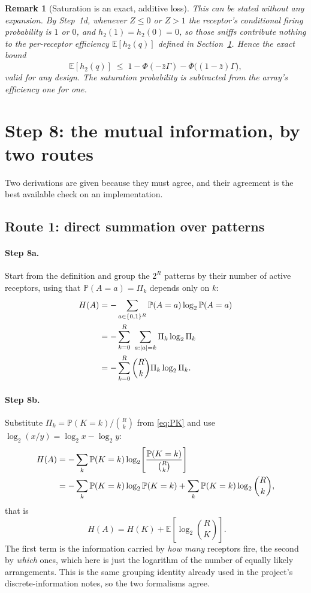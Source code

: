 \documentclass[11pt,a4paper]{article}
\newtheorem{remark}{Remark}
\newcommand{\EE}{\mathbb{E}}
\newcommand{\PP}{\mathbb{P}}
\newcommand{\Phibar}{\overline{\Phi}}
\newcommand{\htwo}{h_2}
\begin{document}
\begin{remark}[Saturation is an exact, additive loss]
This can be stated without any expansion. By Step~1d, whenever $Z\le0$ or $Z>1$ the
receptor's conditional firing probability is $1$ or $0$, and $\htwo(1)=\htwo(0)=0$, so
those sniffs contribute nothing to the per-receptor efficiency $\EE[\htwo(q)]$ defined in
Section~\ref{sec:step6}. Hence the exact bound
\begin{equation}
  \EE[\htwo(q)] \;\le\; 1 - \Phi(-\bar z\Gamma) - \Phibar\big((1-\bar z)\Gamma\big),
\end{equation}
valid for any design. The saturation probability is subtracted from the array's
efficiency one for one.
\end{remark}

\section{Step 8: the mutual information, by two routes}
\label{sec:step6}

Two derivations are given because they must agree, and their agreement is the best
available check on an implementation.

\subsection{Route 1: direct summation over patterns}

\paragraph{Step 8a.} Start from the definition and group the $2^R$ patterns by their
number of active receptors, using that $\PP(A=a)=\Pi_k$ depends only on $k$:
\begin{align}
  H(A) &= -\sum_{a\in\{0,1\}^R}\PP(A=a)\log_2\PP(A=a) \notag\\
       &= -\sum_{k=0}^{R}\ \sum_{a:|a|=k}\Pi_k\log_2\Pi_k \notag\\
       &= -\sum_{k=0}^{R}\binom{R}{k}\Pi_k\log_2\Pi_k .
\end{align}

\paragraph{Step 8b.} Substitute $\Pi_k=\PP(K=k)/\binom{R}{k}$ from \eqref{eq:PK} and use
$\log_2(x/y)=\log_2 x-\log_2 y$:
\begin{align}
  H(A) &= -\sum_k \PP(K=k)\log_2\!\left[\frac{\PP(K=k)}{\binom{R}{k}}\right] \notag\\
       &= -\sum_k \PP(K=k)\log_2 \PP(K=k) + \sum_k \PP(K=k)\log_2\binom{R}{k},
\end{align}
that is
\begin{equation}
  \boxed{\;H(A)=H(K)+\EE\!\left[\log_2\binom{R}{K}\right].}
  \label{eq:grouping}
\end{equation}
The first term is the information carried by \emph{how many} receptors fire, the second
by \emph{which} ones, which here is just the logarithm of the number of equally likely
arrangements. This is the same grouping identity already used in the project's
discrete-information notes, so the two formalisms agree.
\end{document}
